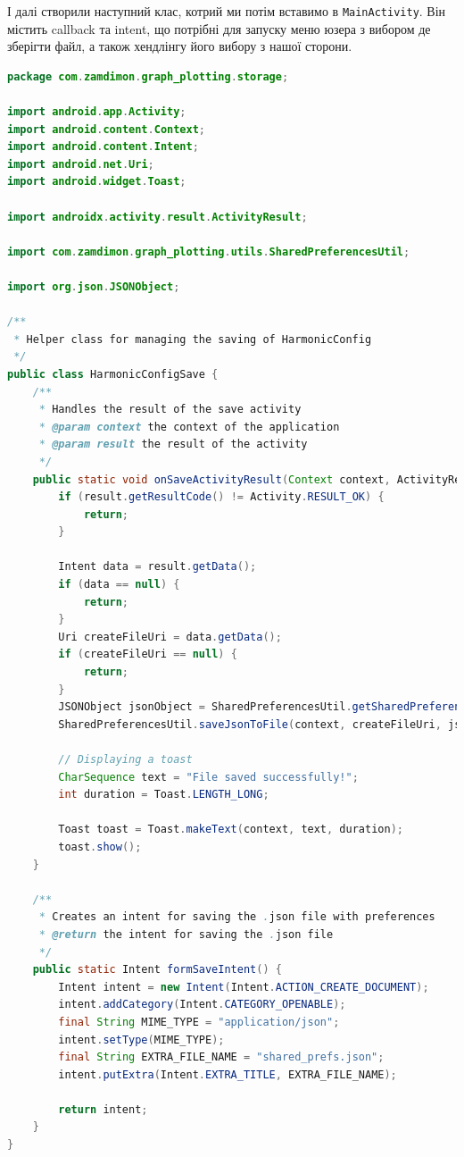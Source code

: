 \documentclass[oneside,solution]{android-assign}
\begin{document}
І далі створили наступний клас, котрий ми потім вставимо в \texttt{MainActivity}. Він містить callback та intent, що потрібні для запуску меню юзера з вибором де зберігти файл, а також хендлінгу його вибору з нашої сторони.
\begin{lstlisting}[language=java]
package com.zamdimon.graph_plotting.storage;

import android.app.Activity;
import android.content.Context;
import android.content.Intent;
import android.net.Uri;
import android.widget.Toast;

import androidx.activity.result.ActivityResult;

import com.zamdimon.graph_plotting.utils.SharedPreferencesUtil;

import org.json.JSONObject;

/**
 * Helper class for managing the saving of HarmonicConfig
 */
public class HarmonicConfigSave {
    /**
     * Handles the result of the save activity
     * @param context the context of the application
     * @param result the result of the activity
     */
    public static void onSaveActivityResult(Context context, ActivityResult result) {
        if (result.getResultCode() != Activity.RESULT_OK) {
            return;
        }

        Intent data = result.getData();
        if (data == null) {
            return;
        }
        Uri createFileUri = data.getData();
        if (createFileUri == null) {
            return;
        }
        JSONObject jsonObject = SharedPreferencesUtil.getSharedPreferencesAsJson(context, HarmonicConfigPreferences.PREFERENCES_NAME);
        SharedPreferencesUtil.saveJsonToFile(context, createFileUri, jsonObject);

        // Displaying a toast
        CharSequence text = "File saved successfully!";
        int duration = Toast.LENGTH_LONG;

        Toast toast = Toast.makeText(context, text, duration);
        toast.show();
    }

    /**
     * Creates an intent for saving the .json file with preferences
     * @return the intent for saving the .json file
     */
    public static Intent formSaveIntent() {
        Intent intent = new Intent(Intent.ACTION_CREATE_DOCUMENT);
        intent.addCategory(Intent.CATEGORY_OPENABLE);
        final String MIME_TYPE = "application/json";
        intent.setType(MIME_TYPE);
        final String EXTRA_FILE_NAME = "shared_prefs.json";
        intent.putExtra(Intent.EXTRA_TITLE, EXTRA_FILE_NAME);

        return intent;
    }
}
\end{lstlisting}
\end{document}
